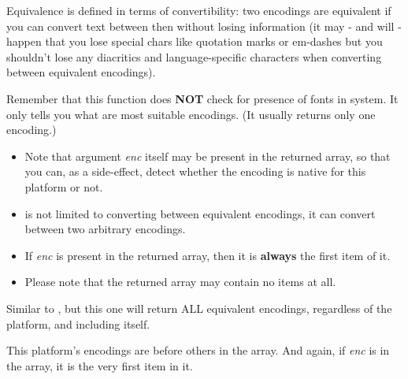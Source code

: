 Equivalence is defined in terms of convertibility:
two encodings are equivalent if you can convert text between
then without losing information (it may - and will - happen
that you lose special chars like quotation marks or em-dashes
but you shouldn't lose any diacritics and language-specific
characters when converting between equivalent encodings).

Remember that this function does {\bf NOT} check for presence of
fonts in system. It only tells you what are most suitable
encodings. (It usually returns only one encoding.)


\begin{itemize}\itemsep=0pt
\item Note that argument {\it enc} itself may be present in the returned array,
so that you can, as a side-effect, detect whether the
encoding is native for this platform or not.
\item {} is not limited to 
converting between equivalent encodings, it can convert between two arbitrary
encodings.
\item If {\it enc} is present in the returned array, then it is {\bf always} the first
item of it.
\item Please note that the returned array may contain no items at all.
\end{itemize}


\label{wxencodingconvertergetallequivalents}


Similar to 
, 
but this one will return ALL 
equivalent encodings, regardless of the platform, and including itself.

This platform's encodings are before others in the array. And again, if {\it enc} is in the array,
it is the very first item in it.

